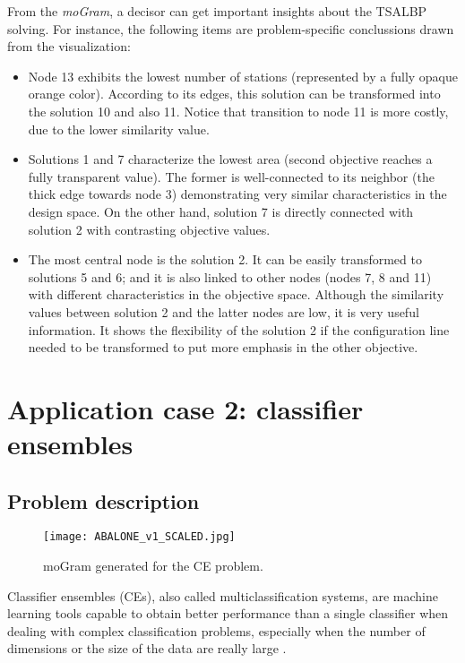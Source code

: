 \documentclass[journal]{IEEEtran}
\begin{document}
From the \emph{moGram}, a decisor can get important insights about the TSALBP solving. For instance, the following items are problem-specific conclussions drawn from the visualization:

\begin{itemize}
 \item Node 13 exhibits the lowest number of stations (represented by a fully opaque orange color). According to its edges, this solution can be transformed into the solution 10 and also 11. Notice that transition to node 11 is more costly, due to the lower similarity value. 
 
 \item Solutions 1 and 7 characterize the lowest area (second objective reaches a fully transparent value). The former is well-connected to its neighbor (the thick edge towards node 3) demonstrating very similar characteristics in the design space. On the other hand, solution 7 is directly connected with solution 2 with contrasting objective values. 

 \item The most central node is the solution 2. It can be easily transformed to solutions 5 and 6; and it is also linked to other nodes (nodes 7, 8 and 11) with different characteristics in the objective space. Although the similarity values between solution 2 and the latter nodes are low, it is very useful information. It shows the flexibility of the solution 2 if the configuration line needed to be transformed to put more emphasis in the other objective.
\end{itemize}


\section{Application case 2: classifier ensembles}
\label{sec:appcase2}

\subsection{Problem description}


\begin{figure*}[ht]
 \centering
\texttt{[image: ABALONE\_v1\_SCALED.jpg]}
\caption{moGram generated for the CE problem.}
\label{fig:ensembles1}
\end{figure*}

Classifier ensembles (CEs), also called multiclassification systems, are machine learning tools capable to obtain better performance than a single
classifier when dealing with complex classification problems, especially when the number of dimensions or the size of the data are really large \cite{Kun04}.
\end{document}
